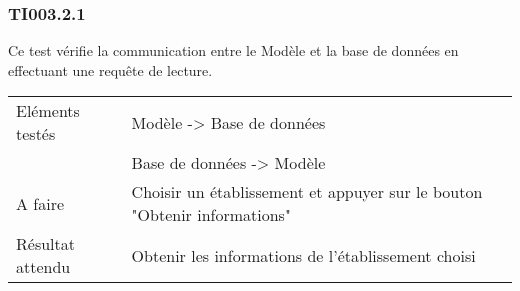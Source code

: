 
\subsubsection{TI003.2.1}
  		Ce test vérifie la communication entre le Modèle et la base de données en effectuant une requête de lecture.
  		\begin{center}
    	 		\begin{tabular}[h]{|p{}|p{}|}
			\hline
				Eléments testés & Modèle -> Base de données  \\
							    &  Base de données -> Modèle \\\hline
    				A faire & Choisir un établissement et appuyer sur le bouton "Obtenir informations" \\\hline
    				Résultat attendu & Obtenir les informations de l'établissement choisi \\\hline
     		\end{tabular}
  		\end{center}	